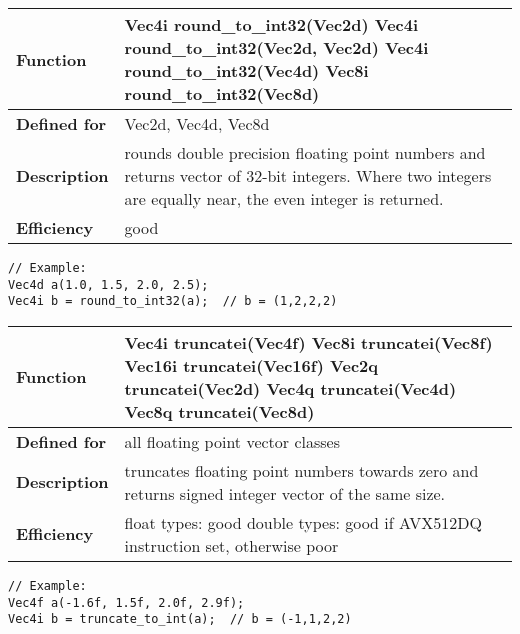 \documentclass[vcl_manual.tex]{subfiles}
\begin{document}
\begin{tabular}{|p{30mm}|p{120mm}|}
\hline
\bfseries Function & 
Vec4i round\_to\_int32(Vec2d) \newline
Vec4i round\_to\_int32(Vec2d, Vec2d) \newline
Vec4i round\_to\_int32(Vec4d) \newline
Vec8i round\_to\_int32(Vec8d)\\ \hline
\bfseries Defined for & Vec2d, Vec4d, Vec8d \\ \hline
\bfseries Description & rounds double precision floating point numbers and returns vector of 32-bit integers. Where two integers are equally near, the even integer is returned. 
\\ \hline
\bfseries Efficiency & good \\ \hline
\end{tabular}
\begin{lstlisting}[frame=none]
// Example:
Vec4d a(1.0, 1.5, 2.0, 2.5);
Vec4i b = round_to_int32(a);  // b = (1,2,2,2)
\end{lstlisting}

\label{truncateToInt}
\begin{tabular}{|p{30mm}|p{120mm}|}
\hline
\bfseries Function & 
Vec4i truncatei(Vec4f) \newline
Vec8i truncatei(Vec8f)\newline
Vec16i truncatei(Vec16f)\newline
Vec2q truncatei(Vec2d) \newline
Vec4q truncatei(Vec4d) \newline
Vec8q truncatei(Vec8d) \\ \hline
\bfseries Defined for & all floating point vector classes \\ \hline
\bfseries Description & truncates floating point numbers towards zero and returns signed integer vector of the same size. \\ \hline
\bfseries Efficiency & 
float types: good \newline
double types: good if AVX512DQ instruction set, otherwise poor  \\ \hline
\end{tabular}
\begin{lstlisting}[frame=none]
// Example:
Vec4f a(-1.6f, 1.5f, 2.0f, 2.9f);
Vec4i b = truncate_to_int(a);  // b = (-1,1,2,2)
\end{lstlisting}
\end{document}
